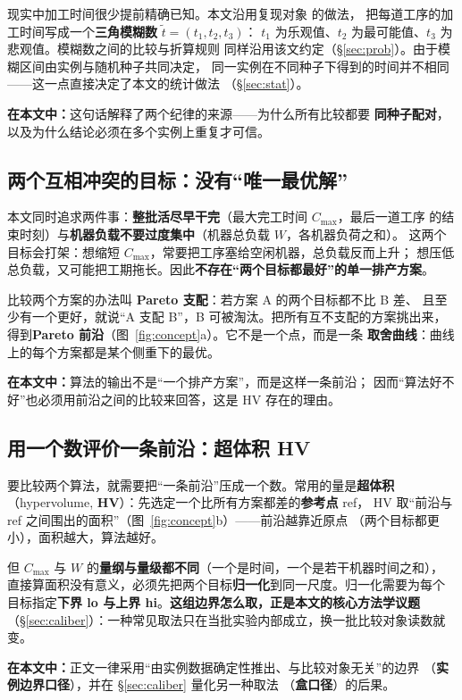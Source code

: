 \documentclass[UTF8, a4paper, 11pt]{ctexart}
\begin{document}
现实中加工时间很少提前精确已知。本文沿用复现对象\cite{li2022rmoead} 的做法，
把每道工序的加工时间写成一个\textbf{三角模糊数} $\tilde t=(t_1,t_2,t_3)$：
$t_1$ 为乐观值、$t_2$ 为最可能值、$t_3$ 为悲观值。模糊数之间的比较与折算规则
同样沿用该文约定（\S\ref{sec:prob}）。由于模糊区间由实例与随机种子共同决定，
同一实例在不同种子下得到的时间并不相同——这一点直接决定了本文的统计做法
（\S\ref{sec:stat}）。

\noindent\textbf{在本文中：}这句话解释了两个纪律的来源——为什么所有比较都要
\textbf{同种子配对}，以及为什么结论必须在多个实例上重复才可信。

\subsection{两个互相冲突的目标：没有“唯一最优解”}
本文同时追求两件事：\textbf{整批活尽早干完}（最大完工时间 $C_{\max}$，最后一道工序
的结束时刻）与\textbf{机器负载不要过度集中}（机器总负载 $W$，各机器负荷之和）。
这两个目标会打架：想缩短 $C_{\max}$，常要把工序塞给空闲机器，总负载反而上升；
想压低总负载，又可能把工期拖长。因此\textbf{不存在“两个目标都最好”的单一排产方案}。

比较两个方案的办法叫 \textbf{Pareto 支配}：若方案 A 的两个目标都不比 B 差、
且至少有一个更好，就说“A 支配 B”，B 可被淘汰。把所有互不支配的方案挑出来，
得到\textbf{Pareto 前沿}（图~\ref{fig:concept}a）。它不是一个点，而是一条
\textbf{取舍曲线}：曲线上的每个方案都是某个侧重下的最优。

\noindent\textbf{在本文中：}算法的输出不是“一个排产方案”，而是这样一条前沿；
因而“算法好不好”也必须用前沿之间的比较来回答，这是 HV 存在的理由。

\subsection{用一个数评价一条前沿：超体积 HV}
要比较两个算法，就需要把“一条前沿”压成一个数。常用的量是\textbf{超体积}
（hypervolume, \textbf{HV}）：先选定一个比所有方案都差的\textbf{参考点} ref，
HV 取“前沿与 ref 之间围出的面积”（图~\ref{fig:concept}b）——前沿越靠近原点
（两个目标都更小），面积越大，算法越好。

但 $C_{\max}$ 与 $W$ 的\textbf{量纲与量级都不同}（一个是时间，一个是若干机器时间之和），
直接算面积没有意义，必须先把两个目标\textbf{归一化}到同一尺度。归一化需要为每个
目标指定\textbf{下界 lo 与上界 hi}。\textbf{这组边界怎么取，正是本文的核心方法学议题}
（\S\ref{sec:caliber}）：一种常见取法只在当批实验内部成立，换一批比较对象读数就变。

\noindent\textbf{在本文中：}正文一律采用“由实例数据确定性推出、与比较对象无关”的边界
（\textbf{实例边界口径}），并在 \S\ref{sec:caliber} 量化另一种取法
（\textbf{盒口径}）的后果。
\end{document}
